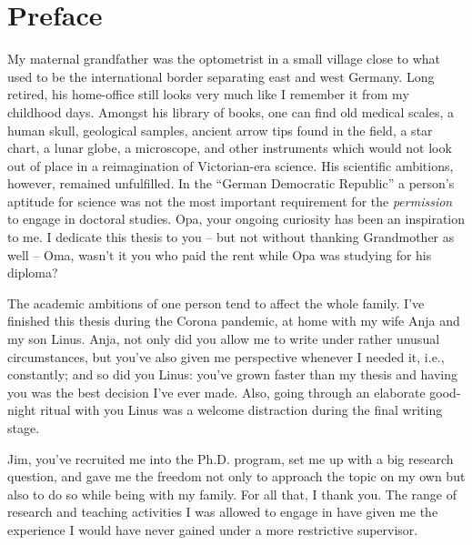 \documentclass[10pt, twoside]{book}
\begin{document}
\tableofcontents

\clearpage


\pagestyle{plain}

\section*{Preface}

My maternal grandfather was the optometrist in a small village close to what used to be the international border separating east and west Germany. Long retired, his home-office still looks very much like I remember it from my childhood days. Amongst his library of books, one can find old medical scales, a human skull, geological samples, ancient arrow tips found in the field, a star chart, a lunar globe, a microscope, and other instruments which would not look out of place in a reimagination of Victorian-era science. His scientific ambitions, however, remained unfulfilled. In the ``German Democratic Republic'' a person's aptitude for science was not the most important requirement for the \emph{permission} to engage in doctoral studies. Opa, your ongoing curiosity has been an inspiration to me. I dedicate this thesis to you -- but not without thanking Grandmother as well -- Oma, wasn't it you who paid the rent while Opa was studying for his diploma?

The academic ambitions of one person tend to affect the whole family. I've finished this thesis during the Corona pandemic, at home with my wife Anja and my son Linus. Anja, not only did you allow me to write under rather unusual circumstances, but you've also given me perspective whenever I needed it, i.e., constantly; and so did you Linus: you've grown faster than my thesis and having you was the best decision I've ever made. Also, going through an elaborate good-night ritual with you Linus was a welcome distraction during the final writing stage.

Jim, you've recruited me into the Ph.D. program, set me up with a big research question, and gave me the freedom not only to approach the topic on my own but also to do so while being with my family. For all that, I thank you. The range of research and teaching activities I was allowed to engage in have given me the experience I would have never gained under a more restrictive supervisor.
  
\end{document}
